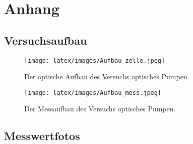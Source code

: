 \section{Anhang}

\subsection{Versuchsaufbau}

\begin{figure}[H]
    \centering
    \texttt{[image: latex/images/Aufbau\_zelle.jpeg]}
    \caption{Der optische Aufbau des Versuchs optisches Pumpen.}
    \label{img:aufb_opt}
\end{figure}

\begin{figure}[H]
    \centering
    \texttt{[image: latex/images/Aufbau\_mess.jpeg]}
    \caption{Der Messaufbau des Versuchs optisches Pumpen.}
    \label{img:aufb_mess}
\end{figure}

\subsection{Messwertfotos}